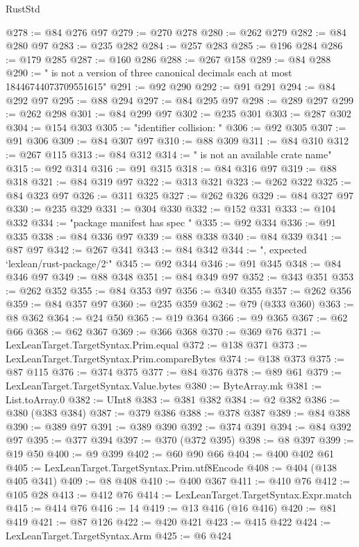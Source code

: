 \begin{lexlean}{RustStd}
\begin{coremodule}
{\begin{coremodule}
{{{{{{{{{{{{{{{{{{{{{{{{{{{{{{{{{{{{{{{{{{{{{{{{{{{{{@278 := @84 @276 @97
@279 := @270 @278
@280 := @262 @279
@282 := @84 @280 @97
@283 := @235 @282
@284 := @257 @283
@285 := @196 @284
@286 := @179 @285
@287 := @160 @286
@288 := @267 @158
@289 := @84 @288
@290 := " is not a version of three canonical decimals each at most 18446744073709551615"
@291 := @92 @290
@292 := @91 @291
@294 := @84 @292 @97
@295 := @88 @294
@297 := @84 @295 @97
@298 := @289 @297
@299 := @262 @298
@301 := @84 @299 @97
@302 := @235 @301
@303 := @287 @302
@304 := @154 @303
@305 := "identifier collision: "
@306 := @92 @305
@307 := @91 @306
@309 := @84 @307 @97
@310 := @88 @309
@311 := @84 @310
@312 := @267 @115
@313 := @84 @312
@314 := " is not an available crate name"
@315 := @92 @314
@316 := @91 @315
@318 := @84 @316 @97
@319 := @88 @318
@321 := @84 @319 @97
@322 := @313 @321
@323 := @262 @322
@325 := @84 @323 @97
@326 := @311 @325
@327 := @262 @326
@329 := @84 @327 @97
@330 := @235 @329
@331 := @304 @330
@332 := @152 @331
@333 := @104 @332
@334 := "package manifest has spec "
@335 := @92 @334
@336 := @91 @335
@338 := @84 @336 @97
@339 := @88 @338
@340 := @84 @339
@341 := @87 @97
@342 := @267 @341
@343 := @84 @342
@344 := ", expected `lexlean/rust-package/2`"
@345 := @92 @344
@346 := @91 @345
@348 := @84 @346 @97
@349 := @88 @348
@351 := @84 @349 @97
@352 := @343 @351
@353 := @262 @352
@355 := @84 @353 @97
@356 := @340 @355
@357 := @262 @356
@359 := @84 @357 @97
@360 := @235 @359
@362 := @79 (@333 @360)
@363 := @8 @362
@364 := @24 @50
@365 := @19 @364
@366 := @9 @365
@367 := @62 @66
@368 := @62 @367
@369 := @366 @368
@370 := @369 @76
@371 := LexLeanTarget.TargetSyntax.Prim.equal
@372 := @138 @371
@373 := LexLeanTarget.TargetSyntax.Prim.compareBytes
@374 := @138 @373
@375 := @87 @115
@376 := @374 @375
@377 := @84 @376
@378 := @89 @61
@379 := LexLeanTarget.TargetSyntax.Value.bytes
@380 := ByteArray.mk
@381 := List.toArray.{0}
@382 := UInt8
@383 := @381 @382
@384 := @2 @382
@386 := @380 (@383 @384)
@387 := @379 @386
@388 := @378 @387
@389 := @84 @388
@390 := @389 @97
@391 := @389 @390
@392 := @374 @391
@394 := @84 @392 @97
@395 := @377 @394
@397 := @370 (@372 @395)
@398 := @8 @397
@399 := @19 @50
@400 := @9 @399
@402 := @60 @90 @66
@404 := @400 @402 @61
@405 := LexLeanTarget.TargetSyntax.Prim.utf8Encode
@408 := @404 (@138 @405 @341)
@409 := @8 @408
@410 := @400 @367
@411 := @410 @76
@412 := @105 @28
@413 := @412 @76
@414 := LexLeanTarget.TargetSyntax.Expr.match
@415 := @414 @76
@416 := 14
@419 := @13 @416 (@16 @416)
@420 := @81 @419
@421 := @87 @126
@422 := @420 @421
@423 := @415 @422
@424 := LexLeanTarget.TargetSyntax.Arm
@425 := @6 @424
}}}}}}}}}}}}}}}}}}}}}}}}}}}}}}}}}}}}}}}}}}}}}}}}}}}}}
\end{coremodule}}
\end{coremodule}
\end{lexlean}
